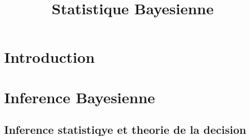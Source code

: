 \documentclass{book}
\title{Statistique Bayesienne}
\begin{document}
\maketitle

\tableofcontents
\chapter{Introduction}
\chapter{Inference Bayesienne}
\section{Inference statistiqye et theorie de la decision}
	
\end{document}
